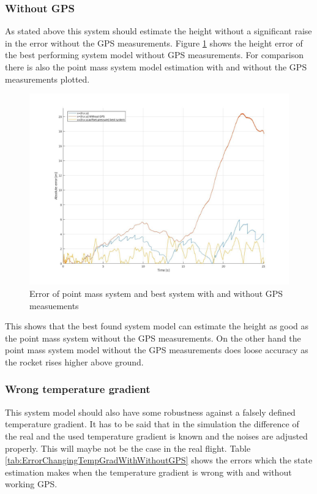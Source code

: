 \subsubsection{Without GPS}
As stated above this system should estimate the height without a significant raise in the error without the GPS measurements.
Figure \ref{fig:ErrorWitoutGPS} shows the height error of the best performing system model without GPS measurements.
For comparison there is also the point mass system model estimation with and without the GPS measurements plotted.

\begin{figure}[h!]
 \centering
 \includegraphics[width=.8\textwidth]{./Pictures/ErrorPointMassBestSystemWithoutGPS.jpg}
 \caption{Error of point mass system and best system with and without GPS measuements}
 \label{fig:ErrorWitoutGPS}
\end{figure}

This shows that the best found system model can estimate the height as good as the point mass system without the GPS measurements.
On the other hand the point mass system model without the GPS measurements does loose accuracy as the rocket rises higher above ground.

\subsubsection{Wrong temperature gradient}
This system model should also have some robustness against a falsely defined temperature gradient.
It has to be said that in the simulation the difference of the real and the used temperature gradient is known and the noises are adjusted properly.
This will maybe not be the case in the real flight.
Table \ref{tab:ErrorChangingTempGradWithWithoutGPS} shows the errors which the state estimation makes when the temperature gradient is wrong with and without working GPS.

